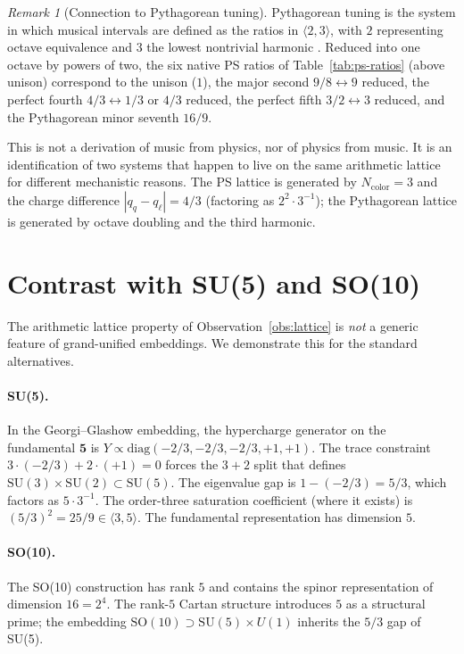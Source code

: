 \documentclass[11pt]{article}
\theoremstyle{plain}
\theoremstyle{remark}
\newtheorem*{remark}{Remark}
\begin{document}
\begin{remark}[Connection to Pythagorean tuning]
Pythagorean tuning is the system in which musical intervals are
defined as the ratios in $\langle 2, 3 \rangle$, with $2$ representing
octave equivalence and $3$ the lowest nontrivial harmonic
\cite{Barker1989}.  Reduced into one octave by powers of two, the
six native PS ratios of Table~\ref{tab:ps-ratios} (above unison)
correspond to the unison ($1$), the major second
$9/8 \leftrightarrow 9$ reduced, the perfect fourth
$4/3 \leftrightarrow 1/3$ or $4/3$ reduced, the perfect fifth
$3/2 \leftrightarrow 3$ reduced, and the Pythagorean minor seventh
$16/9$.

This is not a derivation of music from physics, nor of physics from
music.  It is an identification of two systems that happen to live
on the same arithmetic lattice for different mechanistic reasons.
The PS lattice is generated by $N_{\mathrm{color}} = 3$ and the
charge difference $|q_q - q_\ell| = 4/3$ (factoring as
$2^2 \cdot 3^{-1}$); the Pythagorean lattice is generated by octave
doubling and the third harmonic.
\end{remark}

\section{Contrast with SU(5) and SO(10)}

The arithmetic lattice property of Observation~\ref{obs:lattice} is
\emph{not} a generic feature of grand-unified embeddings.  We
demonstrate this for the standard alternatives.

\paragraph{SU(5).}  In the Georgi--Glashow embedding, the
hypercharge generator on the fundamental $\mathbf{5}$ is
$Y \propto \mathrm{diag}(-2/3, -2/3, -2/3, +1, +1)$.  The trace
constraint $3 \cdot (-2/3) + 2 \cdot (+1) = 0$ forces the
$3 + 2$ split that defines $\mathrm{SU}(3) \times \mathrm{SU}(2)
\subset \mathrm{SU}(5)$.  The eigenvalue gap is
$1 - (-2/3) = 5/3$, which factors as $5 \cdot 3^{-1}$.  The
order-three saturation coefficient (where it exists) is
$(5/3)^2 = 25/9 \in \langle 3, 5 \rangle$.  The fundamental
representation has dimension $5$.

\paragraph{SO(10).}  The SO(10) construction has rank $5$ and
contains the spinor representation of dimension $16 = 2^4$.  The
rank-$5$ Cartan structure introduces $5$ as a structural prime; the
embedding $\mathrm{SO}(10) \supset \mathrm{SU}(5) \times U(1)$
inherits the $5/3$ gap of SU(5).
\end{document}

